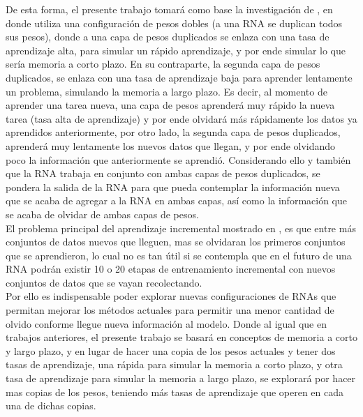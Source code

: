     De esta forma, el presente trabajo tomar\'a como base la investigación de \cite{bullinaria2009}, 
    en donde utiliza una configuración de pesos dobles (a una RNA se duplican todos sus pesos), 
    donde a una capa de pesos duplicados se enlaza con una tasa de aprendizaje alta, para simular un 
    rápido aprendizaje, y por ende simular lo que sería memoria a corto plazo. En su contraparte, 
    la segunda capa de pesos duplicados, se enlaza con una tasa de aprendizaje baja para aprender 
    lentamente un problema, simulando la memoria a largo plazo.  Es decir, al momento de aprender una 
    tarea nueva,  una capa de pesos aprenderá muy rápido la nueva tarea (tasa alta de aprendizaje) y 
    por ende olvidará más rápidamente los datos ya aprendidos anteriormente, por otro lado, la segunda 
    capa de pesos duplicados, aprenderá muy lentamente los nuevos datos que llegan, y por ende olvidando 
    poco la información que anteriormente se aprendió.  Considerando ello y también que la 
    RNA trabaja en conjunto con ambas capas de pesos duplicados, se pondera la salida de la RNA para 
    que pueda contemplar la información nueva que se acaba de agregar a la RNA en ambas capas, así como 
    la información que se acaba de olvidar de ambas capas de pesos.\\

    El problema principal del aprendizaje incremental mostrado en \cite{bullinaria2009}, es que entre 
    más conjuntos de datos nuevos que lleguen, mas se olvidaran los primeros conjuntos que se aprendieron, 
    lo cual no es tan útil si se contempla que en el futuro de una RNA podrán existir 10 o 20 etapas de 
    entrenamiento incremental con nuevos conjuntos de datos que se vayan recolectando.\\

    Por ello es indispensable poder explorar nuevas configuraciones de RNAs que permitan mejorar los 
    métodos actuales para permitir una menor cantidad de olvido conforme llegue nueva información al 
    modelo. Donde al igual que en trabajos anteriores,  el presente trabajo se basará en conceptos de 
    memoria a corto y largo plazo, y en lugar de hacer una copia de los pesos actuales y tener dos 
    tasas de aprendizaje, una rápida para simular la memoria a corto plazo, y otra tasa de aprendizaje 
    para simular la memoria a largo plazo, se explorará por hacer mas copias de los pesos, teniendo más 
    tasas de aprendizaje que operen en cada una de dichas copias.
    